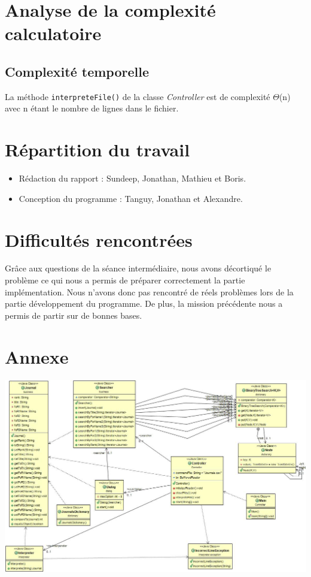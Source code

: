\documentclass[11pt]{article}
\begin{document}
\section{Analyse de la complexité calculatoire}
\subsection{Complexité temporelle}
La méthode \texttt{interpreteFile()} de la classe \textit{Controller} est de complexité $\Theta$(n) avec n étant le nombre de lignes dans le fichier.

\section{Répartition du travail}
\begin{itemize}
\item Rédaction du rapport : Sundeep, Jonathan, Mathieu et Boris.
\item Conception du programme : Tanguy, Jonathan et Alexandre.
\end{itemize}

\section{Difficultés rencontrées}

Grâce aux questions de la séance intermédiaire, nous avons décortiqué le problème ce qui nous a permis de préparer correctement la partie implémentation. Nous n'avons donc pas rencontré de réels problèmes lors de la partie développement du programme. De plus, la mission précédente nous a permis de partir sur de bonnes bases.

\section{Annexe}
\begin{center}
\includegraphics[width=19.5cm, angle=90]{dia.jpg}
\end{center}
\end{document}
